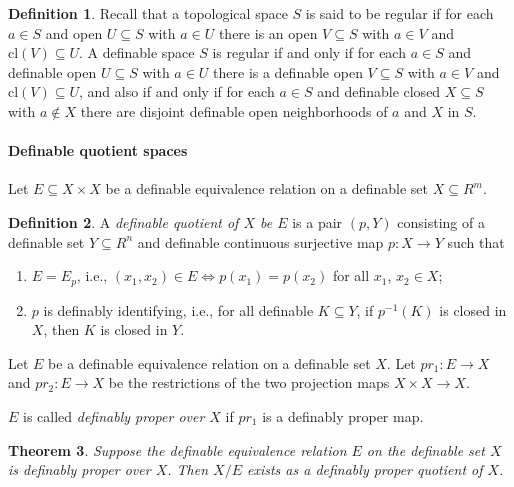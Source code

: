 \documentclass{amsart}
\newtheorem{theorem}{Theorem}[section]
\theoremstyle{definition}
\newtheorem{definition}[theorem]{Definition}
\numberwithin{equation}{section}
\begin{document}
\begin{definition}
    Recall that a topological space $S$ is said to be regular if for each $a \in  S$ and open $U \subseteq S$ with $a \in U$ there is an open $V \subseteq S$ with $a \in V$ and $\mathrm{cl}(V) \subseteq U$. 
    A definable space $S$ is regular if and only if for each $a \in S$ and definable open $U \subseteq S$ with $a \in U$ there is a definable open $V \subseteq S$ with $a \in V$ and $\mathrm{cl}(V) \subseteq U$, 
    and also if and only if for each $a \in S$ and definable closed $X \subseteq S$ with $a \notin X$ there are disjoint definable open neighborhoods of $a$ and $X$ in $S$.
\end{definition}

\paragraph{\bfseries Definable quotient spaces}

Let $E \subseteq X\times X$ be a definable equivalence relation on a definable set $X \subseteq R^m$.

\begin{definition}
    A \emph{definable quotient of $X$ be $E$} is a pair $(p,Y)$ consisting of a definable set $Y \subseteq R^n$ and definable continuous surjective map $p: X\to Y$ such that 
    \begin{enumerate}[label = {(\roman*)}]
        \item $E = E_p$, i.e., $(x_1,x_2) \in E \iff p(x_1) = p(x_2)$ for all $x_1$, $x_2 \in X$;
        \item $p$ is definably identifying, i.e., for all definable $K \subseteq Y$, if $p^{-1}(K)$ is closed in $X$, then $K$ is closed in $Y$.
    \end{enumerate}
\end{definition}

Let $E$ be a definable equivalence relation on a definable set $X$.
Let $pr_1 : E \to X$ and $pr_2 : E \to X$ be the restrictions of the two projection maps $X\times X \to X$.

$E$ is called \emph{definably proper over $X$} if $pr_1$ is a definably proper map.

\begin{theorem}
    Suppose the definable equivalence relation $E$ on the definable set $X$ is definably proper over $X$.
    Then $X/E$ exists as a definably proper quotient of $X$.
\end{theorem}
\end{document}
